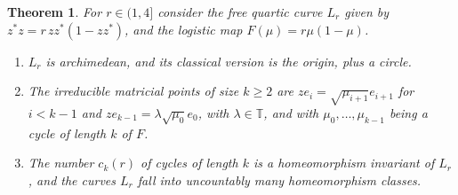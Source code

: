 \documentclass[11pt]{amsart}
\newtheorem{theorem}{Theorem}[section]
\theoremstyle{definition}
\begin{document}
\begin{theorem}\label{t74}
For $r\in(1,4]$ consider the free quartic curve $L_r$ given by $z^*z=r\,zz^*(1-zz^*)$, and the logistic map $F(\mu)=r\mu(1-\mu)$.
\begin{enumerate}
\item $L_r$ is archimedean, and its classical version is the origin, plus a circle.

\item The irreducible matricial points of size $k\geq2$ are $ze_i=\sqrt{\mu_{i+1}}e_{i+1}$ for $i<k-1$ and $ze_{k-1}=\lambda\sqrt{\mu_0}e_0$, with $\lambda\in\mathbb T$, and with $\mu_0,\ldots,\mu_{k-1}$ being a cycle of length $k$ of $F$.

\item The number $c_k(r)$ of cycles of length $k$ is a homeomorphism invariant of $L_r$, and the curves $L_r$ fall into uncountably many homeomorphism classes.
\end{enumerate}
\end{theorem}
\end{document}
